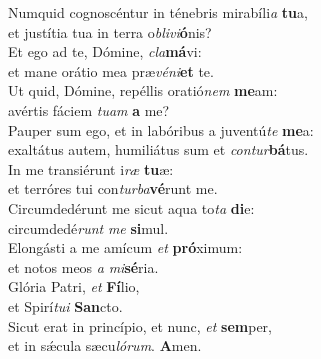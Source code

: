 \oddverse Numquid cognoscéntur in ténebris mirabíli\textit{a} \textbf{tu}a,~\*\\
\oddverse et justítia tua in terra o\textit{bli}\textit{vi}\textbf{ó}nis?\\
\evenverse Et ego ad te, Dómine, \textit{cla}\textbf{má}vi:~\*\\
\evenverse et mane orátio mea præ\textit{vé}\textit{ni}\textbf{et} te.\\
\oddverse Ut quid, Dómine, repéllis oratió\textit{nem} \textbf{me}am:~\*\\
\oddverse avértis fáciem \textit{tu}\textit{am} \textbf{a} me?\\
\evenverse Pauper sum ego, et in labóribus a juventú\textit{te} \textbf{me}a:~\*\\
\evenverse exaltátus autem, humiliátus sum et \textit{con}\textit{tur}\textbf{bá}tus.\\
\oddverse In me transiérunt i\textit{ræ} \textbf{tu}æ:~\*\\
\oddverse et terróres tui con\textit{tur}\textit{ba}\textbf{vé}runt me.\\
\evenverse Circumdedérunt me sicut aqua to\textit{ta} \textbf{di}e:~\*\\
\evenverse circumdedé\textit{runt} \textit{me} \textbf{si}mul.\\
\oddverse Elongásti a me amícum \textit{et} \textbf{pró}ximum:~\*\\
\oddverse et notos meos \textit{a} \textit{mi}\textbf{sé}ria.\\
\evenverse Glória Patri, \textit{et} \textbf{Fí}lio,~\*\\
\evenverse et Spirí\textit{tu}\textit{i} \textbf{San}cto.\\
\oddverse Sicut erat in princípio, et nunc, \textit{et} \textbf{sem}per,~\*\\
\oddverse et in sǽcula sæcu\textit{ló}\textit{rum}. \textbf{A}men.\\
